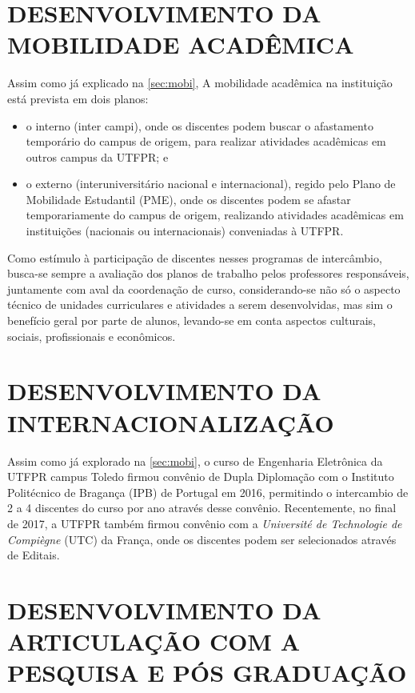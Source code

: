\section{DESENVOLVIMENTO DA MOBILIDADE ACADÊMICA}

Assim como já explicado na \autoref{sec:mobi}, A mobilidade acadêmica na instituição está prevista em dois planos: 

\begin{itemize}
    \item o interno (inter campi), onde os discentes podem buscar o afastamento temporário do campus de origem, para realizar atividades acadêmicas em outros campus da UTFPR; e
    \item o externo (interuniversitário nacional e internacional), regido pelo Plano de Mobilidade Estudantil (PME), onde os discentes podem se afastar temporariamente do campus de origem, realizando atividades acadêmicas em instituições (nacionais ou internacionais) conveniadas à UTFPR.
\end{itemize}
 
Como estímulo à participação de discentes nesses programas de intercâmbio, busca-se sempre a avaliação dos planos de trabalho pelos professores responsáveis, juntamente com aval da coordenação de curso, considerando-se não só o aspecto técnico de unidades curriculares e atividades a serem desenvolvidas, mas sim o benefício geral por parte de alunos, levando-se em conta aspectos culturais, sociais, profissionais e econômicos.

\section{DESENVOLVIMENTO DA INTERNACIONALIZAÇÃO}

Assim como já explorado na \autoref{sec:mobi}, o curso de Engenharia Eletrônica da UTFPR campus Toledo firmou convênio de Dupla Diplomação com o Instituto Politécnico de Bragança (IPB) de Portugal em 2016, permitindo o intercambio de 2 a 4 discentes do curso por ano através desse convênio. Recentemente, no final de 2017, a UTFPR também firmou convênio com a \textit{Université de Technologie de Compiègne} (UTC) da França, onde os discentes podem ser selecionados através de Editais.

\section{DESENVOLVIMENTO DA ARTICULAÇÃO COM A PESQUISA E PÓS GRADUAÇÃO}

